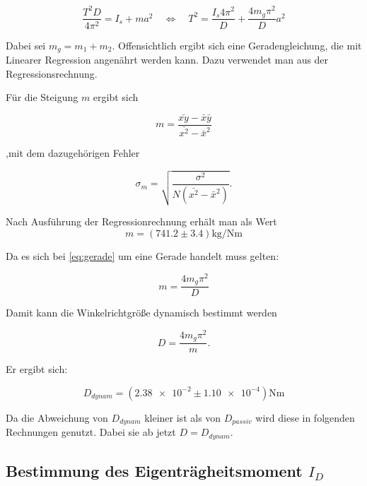 \begin{equation}
\label{eq:gerade}
\frac{T^2D}{4\pi^2}=I_s+ma^2\quad \Leftrightarrow \quad T^2=\frac{I_s 4\pi^2}{D}+\frac{4m_g\pi^2}{D}a^2
\end{equation}

Dabei sei $m_g=m_1+m_2$.
Offensichtlich ergibt sich eine Geradengleichung, die mit Linearer Regression angenährt werden kann.
Dazu verwendet man aus der Regressionsrechnung.

Für die Steigung $m$ ergibt sich

\begin{equation*}
m=\frac{\bar{xy}-\bar{x}\bar{y}}{\bar{x^2}-\bar{x}^2}
\end{equation*}

,mit dem dazugehörigen Fehler

\begin{equation*}
\sigma_m=\sqrt{\frac{\sigma^2}{N(\bar{x^2}-\bar{x}^2)}}.
\end{equation*}

Nach Ausführung der Regressionrechnung erhält man als Wert
\begin{equation}
\label{eq: steigung}
m=\left(\num{741.2}\pm\num{3.4}\right) \si{\kilogram\per\newton\meter}
\end{equation}

Da es sich bei \eqref{eq:gerade} um eine Gerade handelt muss gelten:

\begin{equation*}
m=\frac{4m_g\pi^2}{D}
\end{equation*}

Damit kann die Winkelrichtgröße dynamisch bestimmt werden

\begin{equation*}
D=\frac{4m_g\pi^2}{m}.
\end{equation*}

Er ergibt sich:

\begin{equation}
\label{winkelrichtgroesse_dynamisch}
D_{dynam}=\left(\num{2.38e-2} \pm \num{1.10e-4}\right)\si{\newton\meter}
\end{equation}

Da die Abweichung von $D_{dynam}$ kleiner ist als von $D_{passiv}$ wird 
diese in folgenden Rechnungen genutzt.
Dabei sie ab jetzt $D=D_{dynam}$.


\subsection{Bestimmung des Eigenträgheitsmoment $I_D$}

